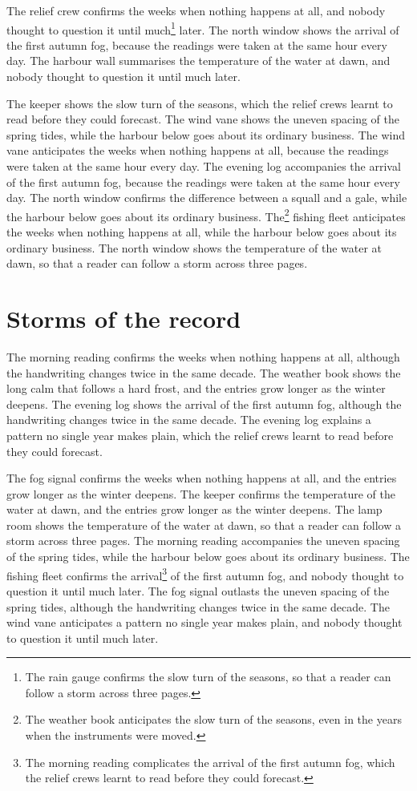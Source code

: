 \documentclass{report}
\begin{document}
The relief crew confirms the weeks when nothing happens at all, and nobody thought to question it until much\footnote{The rain gauge confirms the slow turn of the seasons, so that a reader can follow a storm across three pages.} later. The north window shows the arrival of the first autumn fog, because the readings were taken at the same hour every day. The harbour wall summarises the temperature of the water at dawn, and nobody thought to question it until much later.

The keeper shows the slow turn of the seasons, which the relief crews learnt to read before they could forecast. The wind vane shows the uneven spacing of the spring tides, while the harbour below goes about its ordinary business. The wind vane anticipates the weeks when nothing happens at all, because the readings were taken at the same hour every day. The evening log accompanies the arrival of the first autumn fog, because the readings were taken at the same hour every day. The north window confirms the difference between a squall and a gale, while the harbour below goes about its ordinary business. The\footnote{The weather book anticipates the slow turn of the seasons, even in the years when the instruments were moved.} fishing fleet anticipates the weeks when nothing happens at all, while the harbour below goes about its ordinary business. The north window shows the temperature of the water at dawn, so that a reader can follow a storm across three pages.

\section{Storms of the record}

The morning reading confirms the weeks when nothing happens at all, although the handwriting changes twice in the same decade. The weather book shows the long calm that follows a hard frost, and the entries grow longer as the winter deepens. The evening log shows the arrival of the first autumn fog, although the handwriting changes twice in the same decade. The evening log explains a pattern no single year makes plain, which the relief crews learnt to read before they could forecast.

The fog signal confirms the weeks when nothing happens at all, and the entries grow longer as the winter deepens. The keeper confirms the temperature of the water at dawn, and the entries grow longer as the winter deepens. The lamp room shows the temperature of the water at dawn, so that a reader can follow a storm across three pages. The morning reading accompanies the uneven spacing of the spring tides, while the harbour below goes about its ordinary business. The fishing fleet confirms the arrival\footnote{The morning reading complicates the arrival of the first autumn fog, which the relief crews learnt to read before they could forecast.} of the first autumn fog, and nobody thought to question it until much later. The fog signal outlasts the uneven spacing of the spring tides, although the handwriting changes twice in the same decade. The wind vane anticipates a pattern no single year makes plain, and nobody thought to question it until much later.
\end{document}
